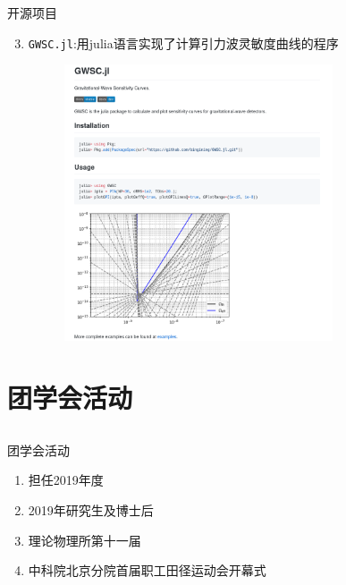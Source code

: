 \documentclass[xcolor=dvipsnames]{beamer} %
\begin{document}
\begin{frame}{开源项目}
    \vspace{-2mm}
    \begin{enumerate}
    \setcounter{enumi}{2}     
        \item \texttt{GWSC.jl}:用julia语言实现了计算引力波灵敏度曲线的程序
        \begin{figure}[htbp!]
            \centering
            \includegraphics[width = 0.75\textwidth]{./pic/GWSC.png}
        \end{figure}
    \end{enumerate} 
\end{frame}

\section{团学会活动}
\subsection{}
\begin{frame}{团学会活动}
    \begin{enumerate}[<+->]   
        \item 担任2019年度
        \vspace{2mm}
        
        \item 2019年研究生及博士后
        \vspace{2mm}
        
        \item 理论物理所第十一届
        \vspace{2mm}
        
        \item 中科院北京分院首届职工田径运动会开幕式
    \end{enumerate} 
\end{frame}
\end{document}
